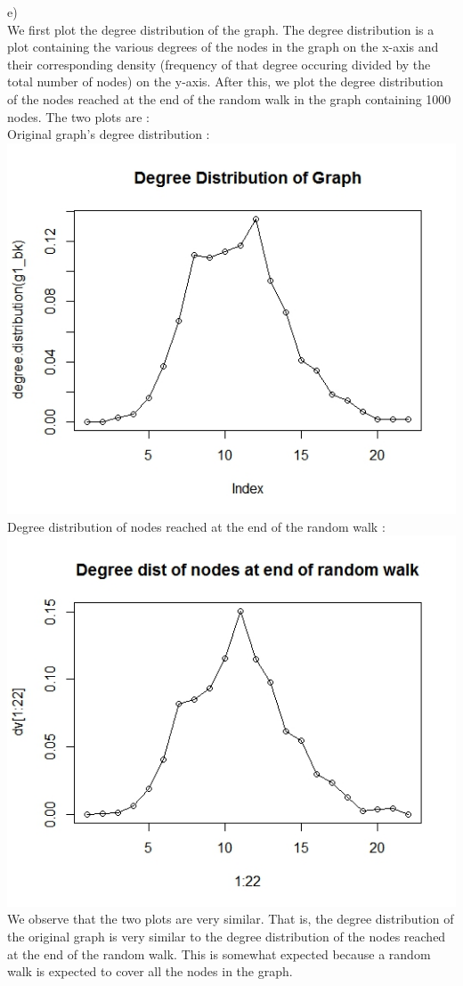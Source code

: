 \documentclass{article}
\begin{document}
e)\\
We first plot the degree distribution of the graph.
The degree distribution is a plot containing the various degrees of the nodes in the graph on the x-axis
and their corresponding density (frequency of that degree occuring divided by the total number of nodes) on the y-axis.
After this, we plot the degree distribution of the nodes reached at the end of the random walk 
in the graph containing 1000 nodes. The two plots are :\\
Original graph's degree distribution :\\
\includegraphics[scale=0.4]{p1g} \\
Degree distribution of nodes reached at the end of the random walk :\\
\includegraphics[scale=0.4]{p1h} \\
We observe that the two plots are very similar. That is, the degree distribution of the 
original graph is very similar to the degree distribution of the nodes reached at the end of the 
random walk. This is somewhat expected because a random walk is expected to cover all the nodes in the graph.\\
\end{document}
